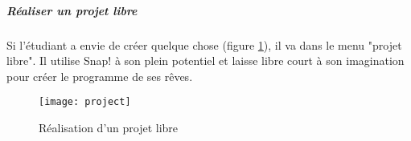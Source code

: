 \subparagraph{Réaliser un projet libre} Si l'étudiant a envie de créer quelque chose (figure \ref{fig:project}), il va dans le menu "projet libre". Il utilise Snap! à son plein potentiel et laisse libre court à son imagination pour créer le programme de ses rêves.
\begin{figure}
  \begin{center}
    \texttt{[image: project]}
    \caption{Réalisation d'un projet libre}
    \label{fig:project}
  \end{center}
\end{figure}
